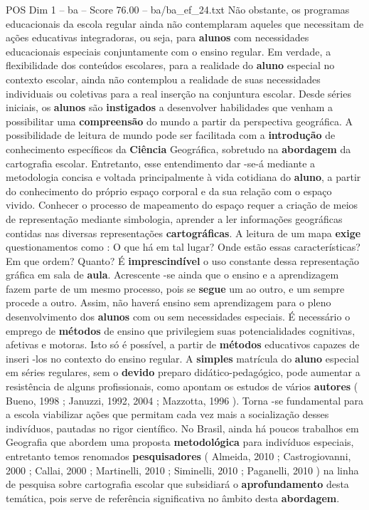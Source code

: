 \begin{textsample}{POS Dim 1 – ba – Score 76.00 – ba/ba\_ef\_24.txt}
Não obstante, os programas educacionais da escola regular ainda não contemplaram aqueles que necessitam de ações educativas integradoras, ou seja, para \textbf{alunos} com necessidades educacionais especiais conjuntamente com o ensino regular.
Em verdade, a flexibilidade dos conteúdos escolares, para a realidade do \textbf{aluno} especial no contexto escolar, ainda não contemplou a realidade de suas necessidades individuais ou coletivas para a real inserção na conjuntura escolar.
Desde séries iniciais, os \textbf{alunos} são \textbf{instigados} a desenvolver habilidades que venham a possibilitar uma \textbf{compreensão} do mundo a partir da perspectiva geográfica.
A possibilidade de leitura de mundo pode ser facilitada com a \textbf{introdução} de conhecimento específicos da \textbf{Ciência} Geográfica, sobretudo na \textbf{abordagem} da cartografia escolar.
Entretanto, esse entendimento dar -se-á mediante a metodologia concisa e voltada principalmente à vida cotidiana do \textbf{aluno}, a partir do conhecimento do próprio espaço corporal e da sua relação com o espaço vivido.
Conhecer o processo de mapeamento do espaço requer a criação de meios de representação mediante simbologia, aprender a ler informações geográficas contidas nas diversas representações \textbf{cartográficas}.
A leitura de um mapa \textbf{exige} questionamentos como : O que há em tal lugar?
Onde estão essas características?
Em que ordem?
Quanto?
É \textbf{imprescindível} o uso constante dessa representação gráfica em sala de \textbf{aula}.
Acrescente -se ainda que o ensino e a aprendizagem fazem parte de um mesmo processo, pois se \textbf{segue} um ao outro, e um sempre procede a outro.
Assim, não haverá ensino sem aprendizagem para o pleno desenvolvimento dos \textbf{alunos} com ou sem necessidades especiais.
É necessário o emprego de \textbf{métodos} de ensino que privilegiem suas potencialidades cognitivas, afetivas e motoras.
Isto só é possível, a partir de \textbf{métodos} educativos capazes de inseri -los no contexto do ensino regular.
A \textbf{simples} matrícula do \textbf{aluno} especial em séries regulares, sem o \textbf{devido} preparo didático-pedagógico, pode aumentar a resistência de alguns profissionais, como apontam os estudos de vários \textbf{autores} ( Bueno, 1998 ; Januzzi, 1992, 2004 ; Mazzotta, 1996 ).
Torna -se fundamental para a escola viabilizar ações que permitam cada vez mais a socialização desses indivíduos, pautadas no rigor científico.
No Brasil, ainda há poucos trabalhos em Geografia que abordem uma proposta \textbf{metodológica} para indivíduos especiais, entretanto temos renomados \textbf{pesquisadores} ( Almeida, 2010 ; Castrogiovanni, 2000 ; Callai, 2000 ; Martinelli, 2010 ; Siminelli, 2010 ; Paganelli, 2010 ) na linha de pesquisa sobre cartografia escolar que subsidiará o \textbf{aprofundamento} desta temática, pois serve de referência significativa no âmbito desta \textbf{abordagem}.

\end{textsample}
